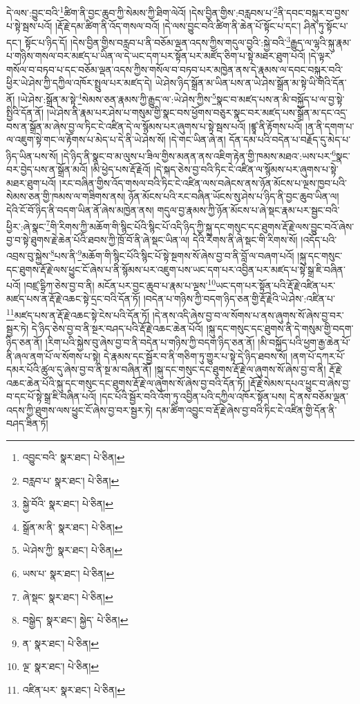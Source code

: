 དེ་ལས་:བྱུང་བའི་\footnote{འབྱུང་བའི་  སྣར་ཐང་།  པེ་ཅིན། }ཚིག་ནི་བྱང་ཆུབ་ཀྱི་སེམས་ཀྱི་ཐིག་ལེའོ། །དེས་བྱིན་གྱིས་:བརླབས་པ་\footnote{བརླབ་པ་  སྣར་ཐང་།  པེ་ཅིན། }ནི་དབང་བསྐུར་བ་བྱས་པ་སྟེ་སྦས་པའོ། །རྡོ་རྗེ་དམ་ཚིག་ནི་འོད་གསལ་བའོ། །དེ་ལས་བྱུང་བའི་ཚིག་ནི་ཆེན་པོ་སྟོང་པ་དང་། ཤིན་ཏུ་སྟོང་པ་དང་། སྟོང་པ་ཉིད་དོ། །དེས་བྱིན་གྱིས་བརླབ་པ་ནི་བཅོམ་ལྡན་འདས་ཀྱིས་གདུལ་བྱའི་:སྐྱེ་བའི་\footnote{སྐྱེ་བོའི་  སྣར་ཐང་།  པེ་ཅིན། }རྒྱུད་ལ་ལྷའི་སྐུ་རྣམ་པ་གཉིས་གསལ་བར་མཛད་པ་ཡིན་ལ་དེ་ཡང་དག་པར་སྟོན་པར་མཛོད་ཅིག་པ་སྟེ་མཐར་ཐུག་པའོ། །དེ་ལྟར་གསོལ་བ་བཏབ་པ་དང་བཅོམ་ལྡན་འདས་ཀྱིས་གསོལ་བ་བཏབ་པར་མཁྱེན་ནས་དེ་རྣམས་ལ་དབང་བསྐུར་བའི་ཕྱིར་ཡེ་ཤེས་ཀྱི་དཀྱིལ་འཁོར་སྤྲུལ་པར་མཛད་དེ། ཡེ་ཤེས་ཉིད་སྒྲོན་མ་ཡིན་པས་ན་ཡེ་ཤེས་སྒྲོན་མ་སྟེ་ཡི་གེའི་དོན་ནོ། །ཡེ་ཤེས་:སྒྲོན་མ་སྟེ་\footnote{སྒྲོན་མ་ནི་  སྣར་ཐང་།  པེ་ཅིན། }སེམས་ཅན་རྣམས་ཀྱི་རྒྱུད་ལ་:ཡེ་ཤེས་ཀྱིས་\footnote{ཡེ་ཤེས་ཀྱི་  སྣར་ཐང་།  པེ་ཅིན། }སྣང་བ་མཛད་པས་ན་མི་བསྐྱོད་པ་ལ་བྱ་སྟེ་སྤྱིའི་དོན་ནོ། །ཡེ་ཤེས་ནི་རྣམ་པར་ཤེས་པ་གསུམ་གྱི་སྣང་བས་ཕྱོགས་བཅུར་སྣང་བར་མཛད་པས་སྒྲོན་མ་དང་འདྲ་བས་ན་སྒྲོན་མ་ཞེས་བྱ་ལ་ཏིང་ངེ་འཛིན་དེ་ལ་སྙོམས་པར་ཞུགས་པ་སྟེ་སྦས་པའོ། །ཛྙཱ་ནི་རྟོགས་པའོ། །ན་ནི་དགག་པ་ལ་འཇུག་སྟེ་གང་ལ་རྟོགས་པ་མེད་པ་དེ་ནི་ཡེ་ཤེས་སོ། །དེ་གང་ཡིན་ཞེ་ན། དོན་དམ་པའི་བདེན་པ་བརྗོད་དུ་མེད་པ་ཉིད་ཡིན་པས་སོ། །དེ་ཉིད་ནི་སྣང་བ་མ་ལུས་པ་ཟིལ་གྱིས་མནན་ནས་འཇིག་རྟེན་གྱི་ཁམས་མཐའ་:ཡས་པར་\footnote{ཡས་པ་  སྣར་ཐང་།  པེ་ཅིན། }སྣང་བར་བྱེད་པས་ན་སྒྲོན་མའོ། །མི་ཕྱེད་པས་རྡོ་རྗེའོ། །དེ་སྐད་ཅེས་བྱ་བའི་ཏིང་ངེ་འཛིན་ལ་སྙོམས་པར་ཞུགས་པ་སྟེ་མཐར་ཐུག་པའོ། །རང་བཞིན་གྱིས་འོད་གསལ་བའི་ཏིང་ངེ་འཛིན་ལས་བཞེངས་ནས་ཉོན་མོངས་པ་ལྔས་ཁྱབ་པའི་སེམས་ཅན་གྱི་ཁམས་ལ་གཟིགས་ནས། ཉོན་མོངས་པའི་རང་བཞིན་ཡོངས་སུ་ཤེས་པ་ཉིད་ནི་བྱང་ཆུབ་ཡིན་ལ། དེའི་ངོ་བོ་ཉིད་ནི་བདག་ཡིན་ནོ་ཞེས་མཁྱེན་ནས། གདུལ་བྱ་རྣམས་ཀྱི་ཉོན་མོངས་པ་ཞེ་སྡང་རྣམ་པར་སྦྱང་བའི་ཕྱིར་:ཞེ་སྣང་\footnote{ཞེ་སྡང་  སྣར་ཐང་།  པེ་ཅིན། }གི་རིགས་ཀྱི་མཆོག་གི་སྙིང་པོའི་སྙིང་པོ་འདི་ཉིད་ཀྱི་སྐུ་དང་གསུང་དང་ཐུགས་རྡོ་རྗེ་ལས་བྱུང་བའོ་ཞེས་བྱ་བ་སྟེ་ཐུགས་རྗེ་ཆེན་པོའི་ཐབས་ཀྱི་ཁྲོ་བོ་ནི་ཞེ་སྡང་ཡིན་ལ། དེའི་རིགས་ནི་ཞེ་སྡང་གི་རིགས་སོ། །འདོད་པའི་འབྲས་བུ་སྐྱེས་\footnote{བསྒྱེད་  སྣར་ཐང་། སྐྱེད་  པེ་ཅིན། }པས་ནི་\footnote{ན་  སྣར་ཐང་།  པེ་ཅིན། }མཆོག་གི་སྙིང་པོའི་སྙིང་པོ་སྟེ་སྔགས་སོ་ཞེས་བྱ་བ་ནི་བློ་ལ་བཞག་པའོ། །སྐུ་དང་གསུང་དང་ཐུགས་རྡོ་རྗེ་ལས་ཕྱུང་ངོ་ཞེས་པ་ནི་སྙོམས་པར་འཇུག་པས་ཡང་དག་པར་འབྱིན་པར་མཛད་པ་སྟེ་སྒྲ་ཇི་བཞིན་པའོ། །བཛྲ་དྷྲིཀ་ཅེས་བྱ་བ་ནི། མངོན་པར་བྱང་ཆུབ་པ་རྣམ་པ་ལྔས་\footnote{ལྔ་  སྣར་ཐང་།  པེ་ཅིན། }ཡང་དག་པར་སྟོན་པའི་རྡོ་རྗེ་འཛིན་པར་མཛད་པས་ན་རྡོ་རྗེ་འཆང་སྟེ་དྲང་བའི་དོན་ཏོ། །བདེན་པ་གཉིས་ཀྱི་བདག་ཉིད་ཅན་གྱི་རྡོ་རྗེའི་ཡེ་ཤེས་:འཛིན་པ་\footnote{འཛིན་པར་  སྣར་ཐང་།  པེ་ཅིན། }མཛད་པས་ན་རྡོ་རྗེ་འཆང་སྟེ་ངེས་པའི་དོན་ཏོ། །དེ་ནས་འདི་ཞེས་བྱ་བ་ལ་སོགས་པ་ནས་ཞུགས་སོ་ཞེས་བྱ་བར་སྦྱར་ཏེ། དེ་ཉིད་ཅེས་བྱ་བ་ནི་སྔར་བཤད་པའི་རྡོ་རྗེ་འཆང་ཆེན་པོའོ། །སྐུ་དང་གསུང་དང་ཐུགས་ནི་དེ་གསུམ་གྱི་བདག་ཉིད་ཅན་ནོ། །རིག་པའི་སྐྱེས་བུ་ཞེས་བྱ་བ་ནི་བདེན་པ་གཉིས་ཀྱི་བདག་ཉིད་ཅན་ནོ། །མི་བསྐྱོད་པའི་ཕྱག་རྒྱ་ཆེན་པོ་ནི་ཞལ་ནག་པོ་ལ་སོགས་པ་སྟེ། དེ་རྣམས་དང་སྦྱོར་བ་ནི་གཅིག་ཏུ་གྱུར་པ་སྟེ་དེ་ཉིད་ཐབས་སོ། །ནག་པོ་དཀར་པོ་དམར་པོའི་ཚུལ་དུ་ཞེས་བྱ་བ་ནི་སྔ་མ་བཞིན་ནོ། །སྐུ་དང་གསུང་དང་ཐུགས་རྡོ་རྗེ་ལ་ཞུགས་སོ་ཞེས་བྱ་བ་ནི། རྡོ་རྗེ་འཆང་ཆེན་པོའི་སྐུ་དང་གསུང་དང་ཐུགས་རྡོ་རྗེ་ལ་ཞུགས་སོ་ཞེས་བྱ་བའི་དོན་ཏོ། །རྡོ་རྗེ་སེམས་དཔའ་ཕྱུང་བ་ཞེས་བྱ་བ་དང་པོ་སྟེ་སྒྲ་ཇི་བཞིན་པའོ། །དང་པོའི་སྦྱོར་བའི་འོག་ཏུ་འབྱིན་པའི་དཀྱིལ་འཁོར་སྟོན་པས། དེ་ནས་བཅོམ་ལྡན་འདས་ཀྱི་ཐུགས་ལས་ཕྱུང་ངོ་ཞེས་བྱ་བར་སྦྱར་ཏེ། དམ་ཚིག་འབྱུང་བ་རྡོ་རྗེ་ཞེས་བྱ་བའི་ཏིང་ངེ་འཛིན་གྱི་དོན་ནི་བཤད་ཟིན་ཏོ། 